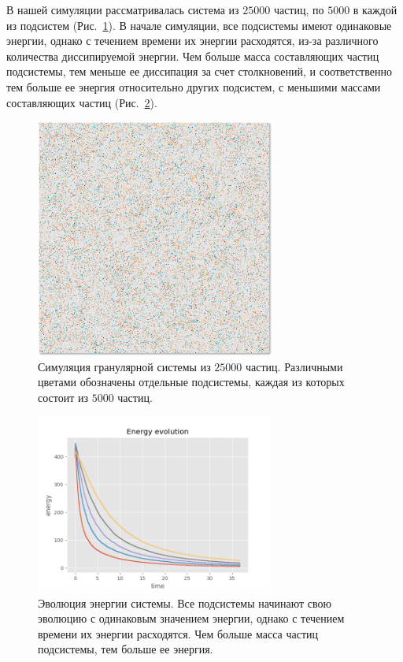 В нашей симуляции рассматривалась система из $25000$ частиц, по $5000$ в каждой из подсистем (Рис.~\ref{fig:md_sim}).
В начале симуляции, все подсистемы имеют одинаковые энергии, однако с течением времени их энергии расходятся, из-за 
различного количества диссипируемой энергии. Чем больше масса составляющих частиц подсистемы, тем меньше ее диссипация
за счет столкновений, и соответственно тем больше ее энергия относительно других подсистем, с меньшими массами составляющих частиц 
(Рис.~\ref{fig:energy_evo}).

\begin{figure}[ht]
  \centering
  \includegraphics[width=0.7\textwidth]{figures/MD_sim_1.png}
  \caption{Симуляция гранулярной системы из $25000$ частиц. Различными цветами обозначены отдельные подсистемы,
  каждая из которых состоит из $5000$ частиц.}
  \label{fig:md_sim}
\end{figure}

\begin{figure}[ht]
  \centering
  \includegraphics[width=0.7\textwidth]{figures/energy_evo.png}
  \caption{Эволюция энергии системы. Все подсистемы начинают свою эволюцию с одинаковым значением энергии,
  однако с течением времени их энергии расходятся. Чем больше масса частиц подсистемы, тем больше ее энергия.}
  \label{fig:energy_evo}
\end{figure}